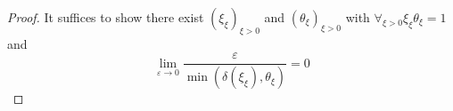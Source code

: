 \begin{proof}
  It suffices to show there exist \((ξ_{ξ})_{ξ>0}\) and \((θ_{ξ})_{ξ>0}\) with \(∀_{ξ>0}ξ_{ξ}θ_{ξ}=1\) and
  \[ \lim_{ε→0}\frac{ε}{\min(δ(ξ_{ξ}),θ_{ξ})}=0 \]
\end{proof}




